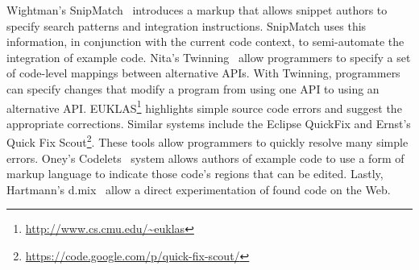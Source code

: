 Wightman's SnipMatch~\cite{Wightman:2012gc} introduces a markup that allows snippet authors to specify search patterns and integration instructions. SnipMatch uses this information, in conjunction with the current code context, to semi-automate the integration of example code. Nita's Twinning~\cite{Nita:2010en} allow programmers to specify a set of code-level mappings between alternative APIs. With Twinning, programmers can specify changes that modify a program from using one API to using an alternative API. EUKLAS\footnote{\url{http://www.cs.cmu.edu/~euklas}} highlights simple source code errors and suggest the appropriate corrections. Similar systems include the Eclipse QuickFix and Ernst's Quick Fix Scout\footnote{\url{https://code.google.com/p/quick-fix-scout/}}. These tools allow programmers to quickly resolve many simple errors. Oney's Codelets~\cite{Oney:2012ge} system allows authors of example code to use a form of markup language to indicate those code's regions that can be edited. Lastly, Hartmann's d.mix~\cite{Hartmann:2007wf} allow a direct experimentation of found code on the Web.



